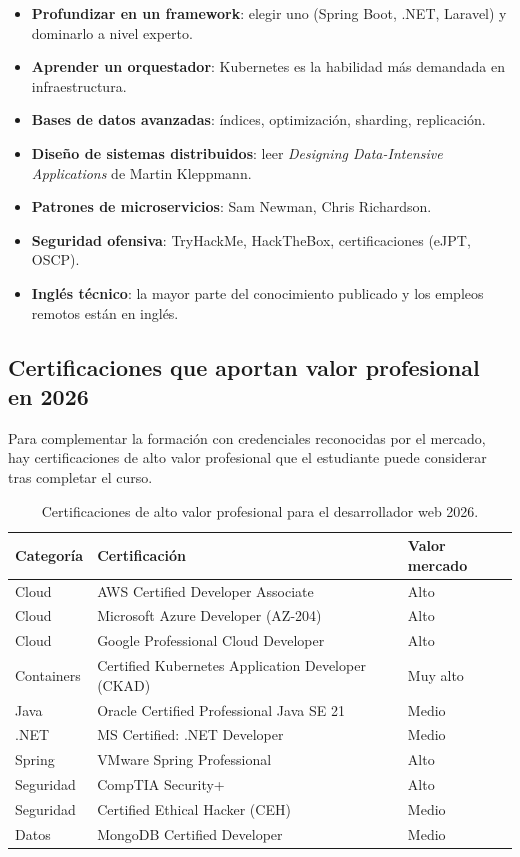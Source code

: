 \documentclass[11pt,a4paper,openany]{book}
\begin{document}
\begin{itemize}
\item \textbf{Profundizar en un framework}: elegir uno (Spring Boot,
.NET, Laravel) y dominarlo a nivel experto.
\item \textbf{Aprender un orquestador}: Kubernetes es la habilidad
más demandada en infraestructura.
\item \textbf{Bases de datos avanzadas}: índices, optimización,
sharding, replicación.
\item \textbf{Diseño de sistemas distribuidos}: leer
\emph{Designing Data-Intensive Applications} de Martin Kleppmann.
\item \textbf{Patrones de microservicios}: Sam Newman, Chris
Richardson.
\item \textbf{Seguridad ofensiva}: TryHackMe, HackTheBox,
certificaciones (eJPT, OSCP).
\item \textbf{Inglés técnico}: la mayor parte del conocimiento
publicado y los empleos remotos están en inglés.
\end{itemize}

\subsection{Certificaciones que aportan valor profesional en 2026}

Para complementar la formación con credenciales reconocidas
por el mercado, hay certificaciones de alto valor profesional que el
estudiante puede considerar tras completar el curso.


\begin{table}[htbp]
\centering
\caption{Certificaciones de alto valor profesional para el desarrollador web 2026.}
\footnotesize
\begin{tabularx}{\textwidth}{lXl}
\toprule
\textbf{Categoría} & \textbf{Certificación} & \textbf{Valor mercado}\\
\midrule
Cloud & AWS Certified Developer Associate & Alto\\
Cloud & Microsoft Azure Developer (AZ-204) & Alto\\
Cloud & Google Professional Cloud Developer & Alto\\
Containers & Certified Kubernetes Application Developer (CKAD) & Muy alto\\
Java & Oracle Certified Professional Java SE 21 & Medio\\
.NET & MS Certified: .NET Developer & Medio\\
Spring & VMware Spring Professional & Alto\\
Seguridad & CompTIA Security+ & Alto\\
Seguridad & Certified Ethical Hacker (CEH) & Medio\\
Datos & MongoDB Certified Developer & Medio\\
\bottomrule
\end{tabularx}
\end{table}
\end{document}
